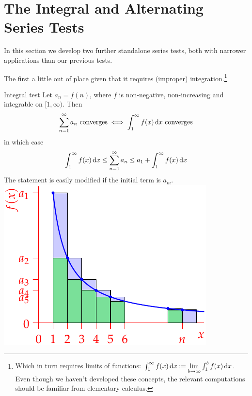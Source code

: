 \clearpage

\section{The Integral and Alternating Series Tests}

In this section we develop two further standalone series tests, both with narrower applications than our previous tests.\smallbreak


The first a little out of place given that it requires (improper) integration.\footnote{Which in turn requires limits of functions: $\int_1^\infty f(x)\,{\mathrm{d} x}:=\lim\limits_{b\to\infty}\int_1^bf(x)\,{\mathrm{d} x}$. Even though we haven't developed these concepts, the relevant computations should be familiar from elementary calculus.} 

\begin{thm}[lower separated=false, sidebyside, sidebyside align=top seam, sidebyside gap=0pt, righthand width=0.4\linewidth]{Integral test}{}
	Let $a_n=f(n)$, where $f$ is non-negative, non-increasing and integrable on $[1,\infty)$. Then
	\[\sum_{n=1}^\infty a_n\ \text{converges} \iff \int_1^\infty f(x)\,\dx\ \text{converges}\]
	in which case
	\[\int_1^\infty f(x)\,{\mathrm{d} x}\le\sum_{n=1}^\infty a_n\le a_1+\int_1^\infty f(x)\,{\mathrm{d} x}\]
	The statement is easily modified if the initial term is $a_m$.
	\tcblower
	\flushright\includegraphics[scale=0.9]{integraltest}
\end{thm}

